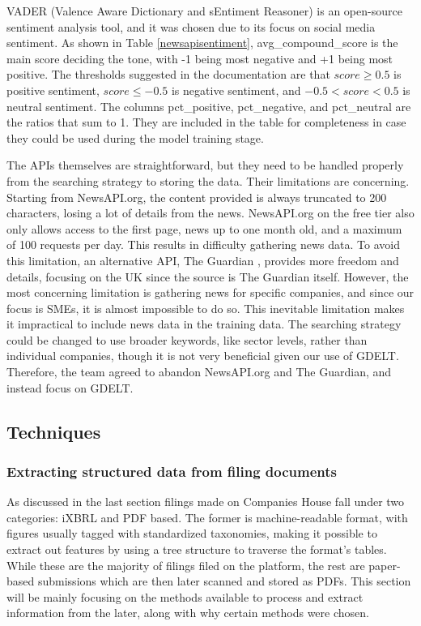 \documentclass[ %
                    author={Natchalin Iwsakul \\ Inkaphol Siriwongwattana \\ Tanaphan Kummaraphat \\ Patorn Srisupap},
                supervisor={Fernando Moreno-Pino},
                    degree={MSc},
                     title={Propensity Modelling for SME Commercial Lending Using Open Public Data},
                  subtitle={Companies House filings and GDELT media coverage as predictors of first-time borrowing},
                      type={},
                      year={2026}]{dissertation}
\begin{document}
VADER (Valence Aware Dictionary and sEntiment Reasoner) \cite{hutto_cjhuttovadersentiment_2026} is an open-source sentiment analysis tool, and it was chosen due to its focus on social media sentiment. As shown in Table \ref{newsapisentiment}, avg\_compound\_score is the main score deciding the tone, with -1 being most negative and +1 being most positive. The thresholds suggested in the documentation \cite{} are that $score \geq 0.5$ is positive sentiment, $score \leq -0.5$ is negative sentiment, and $-0.5 < score < 0.5$ is neutral sentiment. The columns pct\_positive, pct\_negative, and pct\_neutral are the ratios that sum to 1. They are included in the table for completeness in case they could be used during the model training stage.

The APIs themselves are straightforward, but they need to be handled properly from the searching strategy to storing the data. Their limitations are concerning. Starting from NewsAPI.org, the content provided is always truncated to 200 characters, losing a lot of details from the news. NewsAPI.org \cite{newsapi.org} on the free tier also only allows access to the first page, news up to one month old, and a maximum of 100 requests per day. This results in difficulty gathering news data. To avoid this limitation, an alternative API, The Guardian \cite{theguardian}, provides more freedom and details, focusing on the UK since the source is The Guardian itself. However, the most concerning limitation is gathering news for specific companies, and since our focus is SMEs, it is almost impossible to do so. This inevitable limitation makes it impractical to include news data in the training data. The searching strategy could be changed to use broader keywords, like sector levels, rather than individual companies, though it is not very beneficial given our use of GDELT. Therefore, the team agreed to abandon NewsAPI.org and The Guardian, and instead focus on GDELT.


\subsection{Techniques}
\label{sec:techniques}

\subsubsection{Extracting structured data from filing documents}
\label{sec:extraction}
As discussed in the last section filings made on Companies House fall under two categories: iXBRL and PDF based. The former is machine-readable format, with figures usually tagged with standardized taxonomies, making it possible to extract out features by using a tree structure to traverse the format's tables. While these are the majority of filings filed on the platform, the rest are paper-based submissions which are then later scanned and stored as PDFs. This section will be mainly focusing on the methods available to process and extract information from the later, along with why certain methods were chosen.
\end{document}
